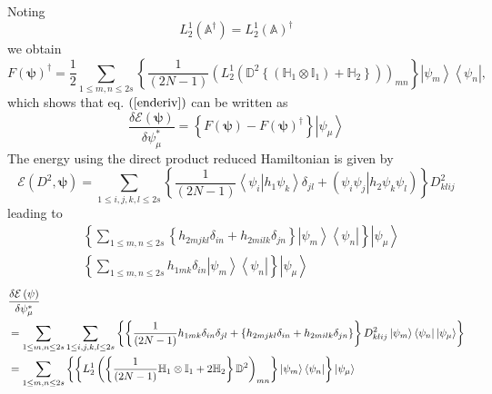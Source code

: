 \documentclass[aps,preprint]{revtex4}
\begin{document}
Noting 
\begin{equation}
L_{2}^{1}\left( \mathbb{A}^{\dagger }\right) =L_{2}^{1}\left( \mathbb{A}%
\right) ^{\dagger }
\end{equation}%
we obtain 
\begin{equation}
F\left( \mathbf{\psi }\right) ^{\dagger }=\frac{1}{2}\sum_{1\leq m,n\leq
2s}\left\{ \frac{1}{\left( 2N-1\right) }\left( L_{2}^{1}\left( \mathbb{D}%
^{2}\left\{ \left( \mathbb{H}_{1}\otimes \mathbb{I}_{1}\right) +\mathbb{H}%
_{2}\right\} \right) \right) _{mn}\right\} \left\vert \psi _{m}\right\rangle
\left\langle \psi _{n}\right\vert ,
\end{equation}%
which shows that eq. $\left( \ref{enderiv}\right) $ can be written as 
\begin{equation}
\frac{\delta \mathcal{E}\left( \mathbf{\psi }\right) }{\delta \psi _{\mu
}^{\ast }}=\left\{ F\left( \mathbf{\psi }\right) -F\left( \mathbf{\psi }%
\right) ^{\dagger }\right\} \left\vert \psi _{\mu }\right\rangle 
\end{equation}%
The energy using the direct product reduced Hamiltonian is given by 
\begin{equation}
\mathcal{E}\left( D^{2},\mathbf{\psi }\right) =\sum_{1\leq i,j,k,l\leq
2s}\left\{ \frac{1}{\left( 2N-1\right) }\left\langle \left. \psi
_{i}\right\vert h_{1}\psi _{k}\right\rangle \delta _{jl}+\left( \left. \psi
_{i}\psi _{j}\right\vert h_{2}\psi _{k}\psi _{l}\right) \right\} D_{klij}^{2}
\end{equation}%
leading to%
\begin{align}
& \left\{ \sum_{1\leq m,n\leq 2s}\left\{ h_{2mjkl}\delta
_{in}+h_{2milk}\delta _{jn}\right\} \left\vert \psi _{m}\right\rangle
\left\langle \psi _{n}\right\vert \right\} \left\vert \psi _{\mu
}\right\rangle  \\
& \left\{ \sum_{1\leq m,n\leq 2s}h_{1mk}\delta _{in}\left\vert \psi
_{m}\right\rangle \left\langle \psi _{n}\right\vert \right\} \left\vert \psi
_{\mu }\right\rangle 
\end{align}%
\begin{align}
& \frac{\delta \mathcal{E}\left( \mathbf{\psi }\right) }{\delta \psi _{\mu
}^{\ast }} \\
& =\sum_{1\leq m,n\leq 2s}\sum_{1\leq i,j,k,l\leq 2s}\left\{ \left\{ \frac{1%
}{\left( 2N-1\right) }h_{1mk}\delta _{in}\delta _{jl}+\left\{
h_{2mjkl}\delta _{in}+h_{2milk}\delta _{jn}\right\} \right\}
D_{klij}^{2}\left\vert \psi _{m}\right\rangle \left\langle \psi
_{n}\right\vert \left\vert \psi _{\mu }\right\rangle \right\}  \\
& =\sum_{1\leq m,n\leq 2s}\left\{ \left\{ L_{2}^{1}\left( \left\{ \frac{1}{%
\left( 2N-1\right) }\mathbb{H}_{1}\otimes \mathbb{I}_{1}+2\mathbb{H}%
_{2}\right\} \mathbb{D}^{2}\right) _{mn}\right\} \left\vert \psi
_{m}\right\rangle \left\langle \psi _{n}\right\vert \right\} \left\vert \psi
_{\mu }\right\rangle 
\end{align}
\end{document}
